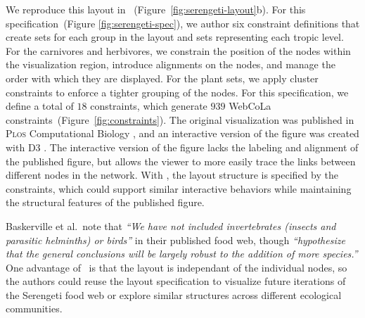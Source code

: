 We reproduce this layout in \projectname~(Figure~\ref{fig:serengeti-layout}b).
For this specification~(Figure \ref{fig:serengeti-spec}), we author six constraint 
definitions that create sets for each group in the layout and sets 
representing each tropic level. For the carnivores and herbivores,
we constrain the position of the nodes within the visualization region,
introduce alignments on the nodes, and manage the order with which they
are displayed. For the plant sets, we apply cluster constraints
to enforce a tighter grouping of the nodes. For this specification,
we define a total of $18$ \projectname constraints, which generate $939$
WebCoLa constraints~(Figure~\ref{fig:constraints}).
The original visualization was published in \textsc{Plos} Computational
Biology \cite{baskerville2011spatial}, and an interactive version of the
figure was created with D3 \cite{baskerville2011interactive}. The
interactive version of the figure lacks the labeling and alignment of the
published figure, but allows the viewer to more easily trace the links
between different nodes in the network. With \projectname, the layout
structure is specified by the constraints, which could support similar
interactive behaviors while maintaining the structural features of the
published figure.

Baskerville et al.\ note that \emph{``We have not included invertebrates
  (insects and parasitic helminths) or birds''} in their published food
web, though \emph{``hypothesize that the general conclusions will be
  largely robust to the addition of more species.''} One advantage of
\projectname~is that the layout is independant of the individual nodes, so
the authors could reuse the layout specification to visualize future iterations
of the Serengeti food web or explore similar structures across different
ecological communities.

